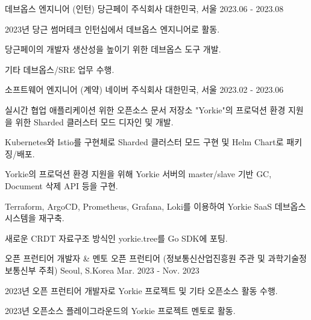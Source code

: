 

\begin{cventries}

  \cventry
    {데브옵스 엔지니어 (인턴)} %
    {당근페이 주식회사} %
    {대한민국, 서울} %
    {2023.06 - 2023.08} %
    {
      \begin{cvitems} %
        \item {2023년 당근 썸머테크 인턴십에서 데브옵스 엔지니어로 활동.}
        \item {당근페이의 개발자 생산성을 높이기 위한 데브옵스 도구 개발.}
        \item {기타 데브옵스/SRE 업무 수행.}
      \end{cvitems}
    }

  \cventry
    {소프트웨어 엔지니어 (계약)} %
    {네이버 주식회사} %
    {대한민국, 서울} %
    {2023.02 - 2023.06} %
    {
      \begin{cvitems} %
        \item {실시간 협업 애플리케이션 위한 오픈소스 문서 저장소 "Yorkie"의 프로덕션 환경 지원을 위한 Sharded 클러스터 모드 디자인 및 개발.}
        \item {Kubernetes와 Istio를 구현체로 Sharded 클러스터 모드 구현 및 Helm Chart로 패키징/배포.}
        \item {Yorkie의 프로덕션 환경 지원을 위해 Yorkie 서버의 master/slave 기반 GC, Document 삭제 API 등을 구현.}        
        \item {Terraform, ArgoCD, Prometheus, Grafana, Loki를 이용하여 Yorkie SaaS 데브옵스 시스템을 재구축.}
        \item {새로운 CRDT 자료구조 방식인 yorkie.tree를 Go SDK에 포팅.}
      \end{cvitems}
    }

  \cventry
    {오픈 프런티어 개발자 \& 멘토} %
    {오픈 프런티어 (정보통신산업진흥원 주관 및 과학기술정보통신부 주최)} %
    {Seoul, S.Korea} %
    {Mar. 2023 - Nov. 2023} %
    {
      \begin{cvitems} %
        \item {2023년 오픈 프런티어 개발자로 Yorkie 프로젝트 및 기타 오픈소스 활동 수행.}
        \item {2023년 오픈소스 플레이그라운드의 Yorkie 프로젝트 멘토로 활동.}
      \end{cvitems}
    }


\end{cventries}
